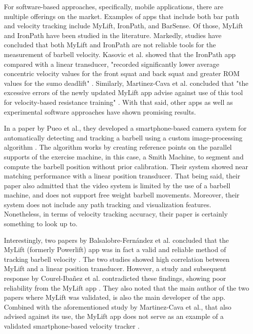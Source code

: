 \documentclass[10pt,twocolumn]{article}
\begin{document}
For software-based approaches, specifically, mobile applications, there are multiple offerings on the market.
Examples of apps that include both bar path and velocity tracking include MyLift, IronPath, and BarSense.
Of those, MyLift and IronPath have been studied in the literature.
Markedly, studies have concluded that both MyLift and IronPath are not reliable tools for the measurement of barbell velocity.
Kasovic et al. showed that the IronPath app compared with a linear transducer, "recorded significantly lower average concentric velocity values for the front squat and back squat and greater ROM values for the sumo deadlift" \cite{Kasovic2021}.
Similarly, Martinez-Cava et al. concluded that "the excessive errors of the newly updated MyLift app advise against use of this tool for velocity-based resistance training" \cite{Martinez-Cava2020}.
With that said, other apps as well as experimental software approaches have shown promising results. \par

In a paper by Pueo et al., they developed a smartphone-based camera system for automatically detecting and tracking a barbell using a custom image-processing algorithm \cite{Pueo2021}.
The algorithm works by creating reference points on the parallel supports of the exercise machine, in this case, a Smith Machine, to segment and compute the barbell position without prior calibration.
Their system showed near matching performance with a linear position transducer.
That being said, their paper also admitted that the video system is limited by the use of a barbell machine, and does not support free weight barbell movements.
Moreover, their system does not include any path tracking and visualization features.
Nonetheless, in terms of velocity tracking accuracy, their paper is certainly something to look up to. \par

Interestingly, two papers by Balsalobre-Fern\'andez et al. concluded that the MyLift (formerly Powerlift) app was in fact a valid and reliable method of tracking barbell velocity \cite{Balsalobre-Fernández2017, Balsalobre-Fernández2018}. 
The two studies showed high correlation between MyLift and a linear position transducer.
However, a study and subsequent response by Courel-Iba\~nez et al. contradicted these findings, showing poor reliability from the MyLift app \cite{Courel-Ibáñez2020}.
They also noted that the main author of the two papers where MyLift was validated, is also the main developer of the app.
Combined with the aforementioned study by Martinez-Cava et al., that also advised against its use, the MyLift app does not serve as an example of a validated smartphone-based velocity tracker \cite{Martinez-Cava2020}.
\end{document}
